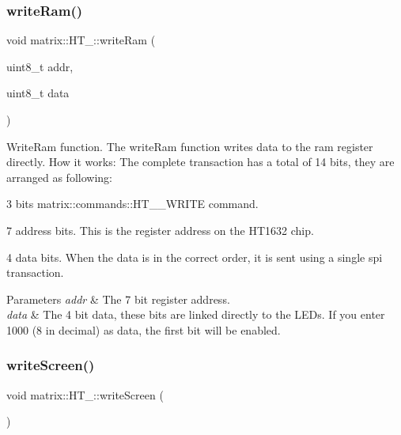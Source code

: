\subsubsection{\texorpdfstring{write\+Ram()}{writeRam()}}
{\footnotesize\ttfamily void matrix\+::\+H\+T\+\_\+::write\+Ram (\begin{DoxyParamCaption}\item[{uint8\+\_\+t}]{addr,  }\item[{uint8\+\_\+t}]{data }\end{DoxyParamCaption})\hspace{0.3cm}{\ttfamily [protected]}}



Write\+Ram function. The write\+Ram function writes data to the ram register directly. How it works\+: The complete transaction has a total of 14 bits, they are arranged as following\+: 


\begin{DoxyItemize}
\item 3 bits matrix\+::commands\+::\+H\+T\+\_\+\_\+\+W\+R\+I\+TE command.
\item 7 address bits. This is the register address on the H\+T1632 chip.
\item 4 data bits. When the data is in the correct order, it is sent using a single spi transaction. 
\begin{DoxyParams}{Parameters}
{\em addr} & The 7 bit register address. \\
\hline
{\em data} & The 4 bit data, these bits are linked directly to the L\+E\+Ds. If you enter 1000 (8 in decimal) as data, the first bit will be enabled. \\
\hline
\end{DoxyParams}

\end{DoxyItemize}\mbox{\label{group___h_t__1632_ga5ed82c4f2f682bcd439aa8a745f01f0f}} 
\subsubsection{\texorpdfstring{write\+Screen()}{writeScreen()}}
{\footnotesize\ttfamily void matrix\+::\+H\+T\+\_\+::write\+Screen (\begin{DoxyParamCaption}{ }\end{DoxyParamCaption})}




